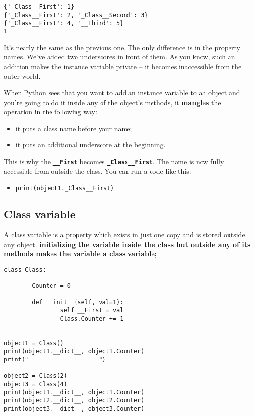 \documentclass[11pt]{article}
\begin{document}
\begin{verbatim}
{'_Class__First': 1}
{'_Class__First': 2, '_Class__Second': 3}
{'_Class__First': 4, '__Third': 5}
1
\end{verbatim}

It’s nearly the same as the previous one. The only difference is in
the property names. We’ve added two underscores in front of them. As
you know, such an addition makes the instance variable private – it
becomes inaccessible from the outer world.

When Python sees that you want to add an instance variable to an
object and you’re going to do it inside any of the object’s methods,
it \textbf{mangles} the operation in the following way:
\begin{itemize}
\item it puts a class name before your name;
\item it puts an additional underscore at the beginning.
\end{itemize}

This is why the \textbf{\texttt{\_\_First}} becomes \textbf{\texttt{\_Class\_\_First}}. The name is now fully
accessible from outside the class. You can run a code like this:
\begin{itemize}
\item \texttt{print(object1.\_Class\_\_First)}

\newpage
\end{itemize}

\subsection{Class variable}
\label{sec:org865ee2b}
A class variable is a property which exists in just one copy and is
stored outside any object. \textbf{initializing the variable inside the class
but outside any of its methods makes the variable a class variable;}

\begin{verbatim}
class Class:

        Counter = 0

        def __init__(self, val=1):
                self.__First = val
                Class.Counter += 1


object1 = Class()
print(object1.__dict__, object1.Counter)
print("--------------------")

object2 = Class(2)
object3 = Class(4)
print(object1.__dict__, object1.Counter)
print(object2.__dict__, object2.Counter)
print(object3.__dict__, object3.Counter)

\end{verbatim}
\end{document}
